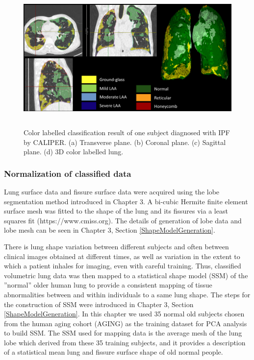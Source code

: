 \begin{figure}[htbp]
  \centering 
  \includegraphics[height=2.9in]{QuantitativeAnalysis/Image/CALIPERResults.png}
  \caption{Color labelled classification result of one subject diagnosed with IPF by CALIPER.  (a) Transverse plane. (b) Coronal plane. (c) Sagittal plane. (d) 3D color labelled lung.}
  \label{fig:CALIPERResults}
\end{figure}

\subsubsection{Normalization of classified data} \label{DataNormalization}
Lung surface data and fissure surface data were acquired using the lobe segmentation method introduced in Chapter 3. A bi-cubic Hermite finite element surface mesh was fitted to the shape of the lung and its fissures via a least squares fit (https://www.cmiss.org). The details of generation of lobe data and lobe mesh can be seen in Chapter 3, Section \ref{ShapeModelGeneration}.

There is lung shape variation between different subjects and often between clinical images obtained at different times, as well as variation in the extent to which a patient inhales for imaging, even with careful training. Thus, classified volumetric lung data was then mapped to a statistical shape model (SSM) of the ''normal'' older human lung to provide a consistent mapping of tissue abnormalities between and within individuals to a same lung shape. The steps for the construction of SSM were introduced in Chapter 3, Section \ref{ShapeModelGeneration}. In this chapter we used 35 normal old subjects chosen from the human aging cohort (AGING) as the training dataset for PCA analysis to build SSM. The SSM used for mapping data is the average mesh of the lung lobe which derived from these 35 training subjects, and it provides a description of a statistical mean lung and fissure surface shape of old normal people.

